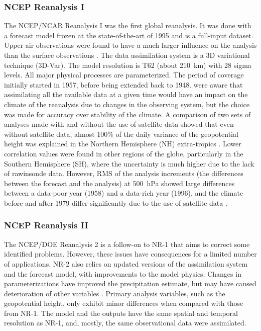 \documentclass[smallextended]{svjour3}       %
\begin{document}
	
	\subsubsection{NCEP Reanalysis I}
	
	The NCEP/NCAR Reanalysis I \citep[NR-1 --][]{Kalnay1996, Kistler2001} was the first global reanalysis. It was done with a forecast model frozen at the state-of-the-art of 1995 and is a full-input dataset. Upper-air observations were found to have a much larger influence on the analysis than the surface observations \citep{Kistler2001}. The data assimilation system is a 3D variational technique (3D-Var). The model resolution is T62 (about 210~km) with 28 sigma levels. All major physical processes are parameterized. The period of coverage initially started in 1957, before being extended back to 1948. \citet{Kalnay1996} were aware that assimilating all the available data at a given time would have an impact on the climate of the reanalysis due to changes in the observing system, but the choice was made for accuracy over stability of the climate. A comparison of two sets of analyses made with and without the use of satellite data showed that even without satellite data, almost 100\% of the daily variance of the geopotential height was explained in the Northern Hemisphere (NH) extra-tropics \citep{Kalnay1996}. Lower correlation values were found in other regions of the globe, particularly in the Southern Hemisphere (SH), where the uncertainty is much higher due to the lack of rawinsonde data. However, RMS of the analysis increments (the differences between the forecast and the analysis) at 500~hPa showed large differences between a data-poor year (1958) and a data-rich year (1996), and the climate before and after 1979 differ significantly due to the use of satellite data \citep{Kistler2001}.
	
	
	\subsubsection{NCEP Reanalysis II}
	
	The NCEP/DOE Reanalysis 2 \citep[NR-2 --][]{Kanamitsu2002} is a follow-on to NR-1 that aims to correct some identified problems. However, these issues have consequences for a limited number of applications. NR-2 also relies on updated versions of the assimilation system and the forecast model, with improvements to the model physics. Changes in parameterizations have improved the precipitation estimate, but may have caused deterioration of other variables \citep{Kistler2001, Kanamitsu2002}. Primary analysis variables, such as the geopotential height, only exhibit minor differences when compared with those from NR-1. The model and the outputs have the same spatial and temporal resolution as NR-1, and, mostly, the same observational data were assimilated.
	
\end{document}
